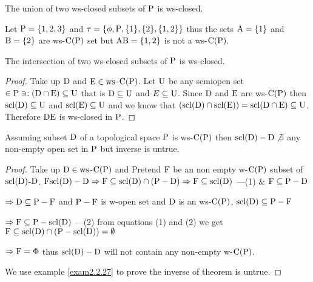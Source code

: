 \begin{thm}\label{thm2.2.23}
The union of two ws-closed subsets of $\mathrm{P}$ is ws-closed.
\end{thm}

\begin{exm}\label{exm2.2.24}
Let $\mathrm{P} = \{1, 2, 3\}$ and $\tau = \{\phi, \mathrm{P}, \{1\}, \{2\}, \{1, 2\}\}$ thus the sets $\mathrm{A}= \{1\}$ and $\mathrm{B}= \{2\}$ are ws-$\mathrm{C}(\mathrm{P})$ set but $\mathrm{A}\mathrm{B} = \{1,2 \}$ is not a ws-$\mathrm{C}(\mathrm{P})$.
\end{exm}

\begin{thm}\label{thm2.2.25}
The intersection of two ws-closed subsets of $\mathrm{P}$ is ws-closed.
\end{thm}

\begin{proof}
Take up $\mathrm{D}$ and $\mathrm{E}\in \mathrm{ws}$-$\mathrm{C}(\mathrm{P})$. Let $\mathrm{U}$ be any semiopen set $\in\mathrm{P} \ni: (\mathrm{D}\cap \mathrm{E})\subseteq \mathrm{U}$ that is $\mathrm{D}\subseteq \mathrm{U}$ and $E\subseteq \mathrm{U}$. Since $\mathrm{D}$ and $\mathrm{E}$ are ws-$\mathrm{C}(\mathrm{P})$ then $\mathrm{scl}(\mathrm{D}) \subseteq  \mathrm{U}$ and $\mathrm{scl}(\mathrm{E})\subseteq \mathrm{U}$ and we know that $(\mathrm{scl}(\mathrm{D})\cap \mathrm{scl}(\mathrm{E})) = \mathrm{scl}(\mathrm{D}\cap \mathrm{E})\subseteq \mathrm{U}$. Therefore $\mathrm{D}\mathrm{E}$ is ws-closed in $\mathrm{P}$.
\end{proof}

\begin{thm}\label{thm2.2.26}
Assuming subset $\mathrm{D}$ of a topological space $\mathrm{P}$ is ws-$\mathrm{C}(\mathrm{P})$ then $\mathrm{scl}(\mathrm{D})-\mathrm{D} \not\exists$ any non-empty open set in $\mathrm{P}$ but inverse is untrue.
\end{thm}

\begin{proof}
Take up $\mathrm{D}\in\mathrm{ws}$-$\mathrm{C}(\mathrm{P})$ and Pretend $\mathrm{F}$ be an non empty w-$\mathrm{C}(\mathrm{P})$ subset of $\mathrm{scl}(\mathrm{D})$-$\mathrm{D}$. $\mathrm{F}\mathrm{scl}(\mathrm{D})-\mathrm{D}\Rightarrow\mathrm{F}\subseteq \mathrm{scl}(\mathrm{D})\cap(\mathrm{P}-\mathrm{D})\Rightarrow \mathrm{F}\subseteq \mathrm{scl}(\mathrm{D})$ ---(1) \& $\mathrm{F}\subseteq\mathrm{P}-\mathrm{D}$

$\Rightarrow \mathrm{D}\subseteq \mathrm{P}-\mathrm{F}$ and $\mathrm{P}-\mathrm{F}$ is w-open set and $\mathrm{D}$ is an ws-$\mathrm{C}(\mathrm{P})$, $\mathrm{scl}(\mathrm{D})\subseteq \mathrm{P}-\mathrm{F}$

$\Rightarrow \mathrm{F}\subseteq \mathrm{P}-\mathrm{scl}(\mathrm{D})$ ---(2) from equations (1) and (2) we get $\mathrm{F}\subseteq \mathrm{scl}(\mathrm{D})\cap(\mathrm{P}-\mathrm{scl}(\mathrm{D}))=\emptyset$

$\Rightarrow\mathrm{F} =\Phi$ thus $\mathrm{scl}(\mathrm{D})-\mathrm{D}$ will not contain any non-empty w-$\mathrm{C}(\mathrm{P})$.

We use example \ref{exam2.2.27} to prove the inverse of theorem is untrue.
\end{proof}

